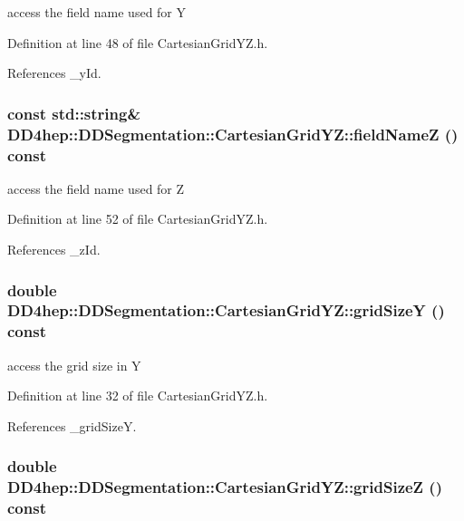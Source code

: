 access the field name used for Y 

Definition at line 48 of file CartesianGridYZ.h.

References \_\-yId.\hypertarget{class_d_d4hep_1_1_d_d_segmentation_1_1_cartesian_grid_y_z_a952f9cd6d85ca88d3e357d8b367b1858}{
\subsubsection[{fieldNameZ}]{\setlength{\rightskip}{0pt plus 5cm}const std::string\& DD4hep::DDSegmentation::CartesianGridYZ::fieldNameZ () const}}
\label{class_d_d4hep_1_1_d_d_segmentation_1_1_cartesian_grid_y_z_a952f9cd6d85ca88d3e357d8b367b1858}


access the field name used for Z 

Definition at line 52 of file CartesianGridYZ.h.

References \_\-zId.\hypertarget{class_d_d4hep_1_1_d_d_segmentation_1_1_cartesian_grid_y_z_a8dbaaa3750cd5604482fe52a7a1b68b3}{
\subsubsection[{gridSizeY}]{\setlength{\rightskip}{0pt plus 5cm}double DD4hep::DDSegmentation::CartesianGridYZ::gridSizeY () const}}
\label{class_d_d4hep_1_1_d_d_segmentation_1_1_cartesian_grid_y_z_a8dbaaa3750cd5604482fe52a7a1b68b3}


access the grid size in Y 

Definition at line 32 of file CartesianGridYZ.h.

References \_\-gridSizeY.\hypertarget{class_d_d4hep_1_1_d_d_segmentation_1_1_cartesian_grid_y_z_a6d22aee2e00a3509e9e018c84fc53ae7}{
\subsubsection[{gridSizeZ}]{\setlength{\rightskip}{0pt plus 5cm}double DD4hep::DDSegmentation::CartesianGridYZ::gridSizeZ () const}}
\label{class_d_d4hep_1_1_d_d_segmentation_1_1_cartesian_grid_y_z_a6d22aee2e00a3509e9e018c84fc53ae7}


